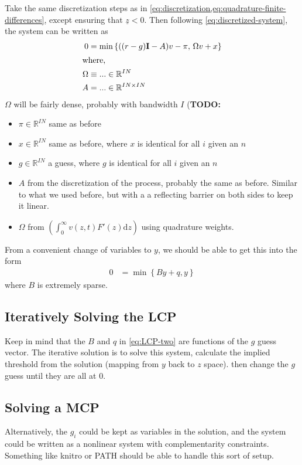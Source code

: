 \documentclass[11pt]{article}
\newcommand{\R}{\ensuremath{\mathbb{R}}}
\newcommand{\diff}{\ensuremath{\mathrm{d}}}
\newcommand{\set}[1]{\ensuremath{\left\{{#1}\right\}}}
\begin{document}
Take the same discretization steps as in \cref{eq:discretization,eq:quadrature-finite-differences}, except ensuring that $\underline{z} < 0$.  Then following \cref{eq:discretized-system}, the system can be written as
\begin{align}
		0 &= \min\set{((r-g)\mathbf{I} - A) v - \pi,\, \Omega v +  x}\\
	\intertext{where,}
	\Omega &\equiv ...\in\R^{I N}\\
	A &=...\in\R^{I N \times I N}
\end{align}
$\Omega$ will be fairly dense, probably with bandwidth $I$
(\textbf{TODO:}
\begin{itemize}
	\item $\pi\in\R^{I N}$ same as before
	\item $x\in\R^{I N}$ same as before, where $x$ is identical for all $i$ given an $n$
	\item $g \in \R^{ I N}$ a guess, where $g$ is identical for all $i$ given an $n$
	\item $A$ from the discretization of the process, probably the same as before.  Similar to what we used before, but with a a reflecting barrier on both sides to keep it linear.
	\item $\Omega$ from $\left(\int_{0}^{\infty} v(z,t) F'(z)\diff z\right)$ using quadrature weights.
\end{itemize}
From a convenient change of variables to $y$, we should be able to get this into the form 
\begin{align}
	0 &= \min\set{B y + q, y}\label{eq:LCP-two}
\end{align}
where $B$ is extremely sparse.
\subsection{Iteratively Solving the LCP}
Keep in mind that the $B$ and $q$ in \cref{eq:LCP-two} are functions of the $g$ guess vector.  The iterative solution is to solve this system, calculate the implied threshold from the solution (mapping from $y$ back to $z$ space). then change the $g$ guess until they are all at $0$.
\subsection{Solving a MCP}
Alternatively, the $g_i$ could be kept as variables in the solution, and the system could be written as a nonlinear system with complementarity constraints.  Something like knitro or PATH should be able to handle this sort of setup.
\end{document}

